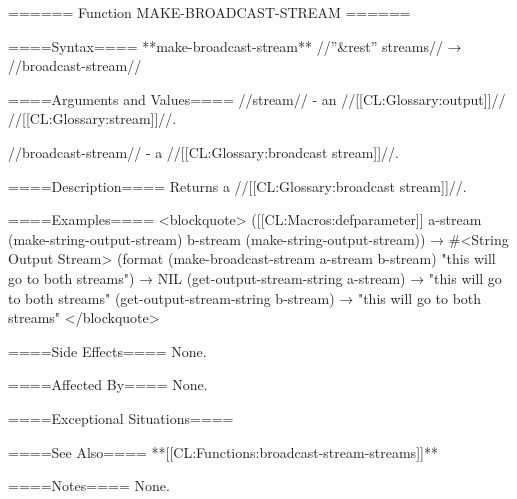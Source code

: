 ====== Function MAKE-BROADCAST-STREAM ======

====Syntax====
**make-broadcast-stream** //''&rest'' streams// → //broadcast-stream//

====Arguments and Values====
//stream// - an //[[CL:Glossary:output]]// //[[CL:Glossary:stream]]//.

//broadcast-stream// - a //[[CL:Glossary:broadcast stream]]//.

====Description====
Returns a //[[CL:Glossary:broadcast stream]]//.

====Examples====
<blockquote> ([[CL:Macros:defparameter]] a-stream (make-string-output-stream) b-stream (make-string-output-stream)) → #<String Output Stream> (format (make-broadcast-stream a-stream b-stream) "this will go to both streams") → NIL (get-output-stream-string a-stream) → "this will go to both streams" (get-output-stream-string b-stream) → "this will go to both streams" </blockquote>

====Side Effects====
None.


====Affected By====
None.

====Exceptional Situations====

====See Also====
**[[CL:Functions:broadcast-stream-streams]]**

====Notes====
None.

